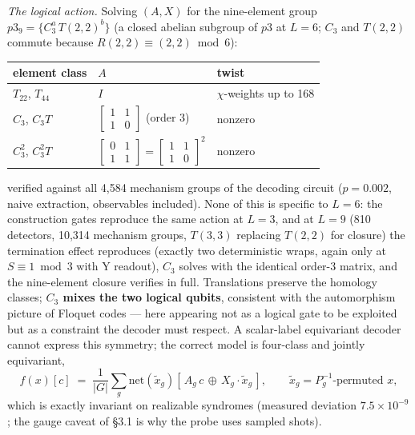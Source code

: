 \documentclass[11pt]{article}
\begin{document}
\emph{The logical action.} Solving $(A, X)$ for the nine-element group
$p3_9 = \{C_3^a\, T(2,2)^b\}$ (a closed abelian subgroup of $p3$ at $L = 6$;
$C_3$ and $T(2,2)$ commute because $R(2,2) \equiv (2,2) \bmod 6$):

\begin{center}
\begin{tabular}{lll}
\toprule
element class & $A$ & twist \\
\midrule
$T_{22}$, $T_{44}$ & $I$ & $\chi$-weights up to 168 \\
$C_3$, $C_3 T$ &
$\left[\begin{smallmatrix}1&1\\1&0\end{smallmatrix}\right]$ (order 3) &
nonzero \\
$C_3^2$, $C_3^2 T$ &
$\left[\begin{smallmatrix}0&1\\1&1\end{smallmatrix}\right] =
\left[\begin{smallmatrix}1&1\\1&0\end{smallmatrix}\right]^2$ & nonzero \\
\bottomrule
\end{tabular}
\end{center}

\noindent verified against all 4{,}584 mechanism groups of the decoding
circuit ($p = 0.002$, naive extraction, observables included). None of this
is specific to $L = 6$: the construction gates reproduce the same action at
$L = 3$, and at $L = 9$ (810 detectors, 10{,}314 mechanism groups, $T(3,3)$
replacing $T(2,2)$ for closure) the termination effect reproduces (exactly
two deterministic wraps, again only at $S \equiv 1 \bmod 3$ with Y readout),
$C_3$ solves with the identical order-3 matrix, and the nine-element closure
verifies in full. Translations preserve the homology classes; \textbf{$C_3$
mixes the two logical qubits}, consistent with the automorphism picture of
Floquet codes \cite{Davydova24,Kobayashi23} --- here appearing not as a
logical gate to be exploited but as a constraint the decoder must respect. A
scalar-label equivariant decoder cannot express this symmetry; the correct
model is four-class and jointly equivariant,
\begin{equation}
f(x)[c] \;=\; \frac{1}{|G|} \sum_{g}
\mathrm{net}(\tilde x_g)\!\left[\, A_g\, c \,\oplus\, X_g \!\cdot\! \tilde
x_g \,\right], \qquad \tilde x_g = P_g^{-1}\text{-permuted } x,
\end{equation}
which is exactly invariant on realizable syndromes (measured deviation
$7.5 \times 10^{-9}$; the gauge caveat of \S3.1 is why the probe uses
sampled shots).
\end{document}
